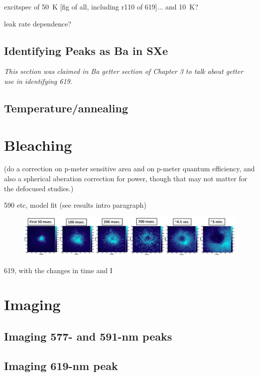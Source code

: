 excitspec of 50~K [fig of all, including r110 of 619]... and 10~K?

leak rate dependence?

\subsection{Identifying Peaks as Ba in SXe}
\label{subsec:peakIdentify}

\emph{\color{gray}This section was claimed in Ba getter section of Chapter 3 to talk about getter use in identifying 619.}

\subsection{Temperature/annealing}

\section{Bleaching}
\label{sec:bleaching}

({\color{red}do a correction on p-meter sensitive area and on p-meter quantum efficiency, and also a spherical aberation correction for power, though that may not matter for the defocused studies.})

590 etc, model fit (see results intro paragraph)

\begin{figure} %
        \centering
                \includegraphics[width=.9\textwidth]{figures/hole_bleach_590.png}
                \caption{}
\label{fig:testfig}
\end{figure}

619, with the changes in time and I

\section{Imaging}
\label{imaging}

\subsection{Imaging 577- and 591-nm peaks}

\subsection{Imaging 619-nm peak}

